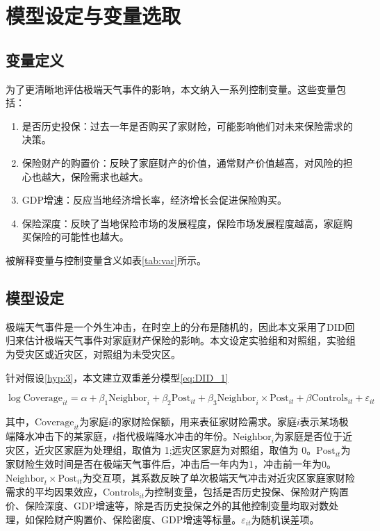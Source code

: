 \section{模型设定与变量选取}
\subsection{变量定义}
为了更清晰地评估极端天气事件的影响，本文纳入一系列控制变量。这些变量包括：

\begin{enumerate}
    \item 是否历史投保：过去一年是否购买了家财险，可能影响他们对未来保险需求的决策。
    \item 保险财产的购置价：反映了家庭财产的价值，通常财产价值越高，对风险的担心也越大，保险需求也越大。
    \item GDP增速：反应当地经济增长率，经济增长会促进保险购买。
    \item 保险深度：反映了当地保险市场的发展程度，保险市场发展程度越高，家庭购买保险的可能性也越大。
\end{enumerate}

被解释变量与控制变量含义如表\ref{tab:var}所示。


\subsection{模型设定}
极端天气事件是一个外生冲击，在时空上的分布是随机的，因此本文采用了DID回归来估计极端天气事件对家庭财产保险的影响。本文设定实验组和对照组，实验组为受灾区或近灾区，对照组为未受灾区。

针对假设\ref{hyp:3}，本文建立双重差分模型\ref{eq:DID_1}

\begin{equation}
    \log\text{Coverage}_{it}=\alpha+\beta_1\text{Neighbor}_{i}+\beta_2\text{Post}_{it}+\beta_3\text{Neighbor}_{i}\times\text{Post}_{it}+\beta\text{Controls}_{it}+\varepsilon_{it}
    \label{eq:DID_2}
\end{equation}

其中，$\text{Coverage}_{it}$为家庭$i$的家财险保额，用来表征家财险需求。家庭$i$表示某场极端降水冲击下的某家庭，$t$指代极端降水冲击的年份。$\text{Neighbor}_{i}$为家庭是否位于近灾区，近灾区家庭为处理组，取值为 1;远灾区家庭为对照组，取值为 0。$\text{Post}_{it}$为家财险生效时间是否在极端天气事件后，冲击后一年内为1，冲击前一年为0。$\text{Neighbor}_{t}\times\text{Post}_{it}$为交互项，其系数反映了单次极端天气冲击对近灾区家庭家财险需求的平均因果效应，$\text{Controls}_{it}$为控制变量，包括是否历史投保、保险财产购置价、保险深度、GDP增速等，除是否历史投保之外的其他控制变量均取对数处理，如保险财产购置价、保险密度、GDP增速等标量。$\varepsilon_{it}$为随机误差项。

